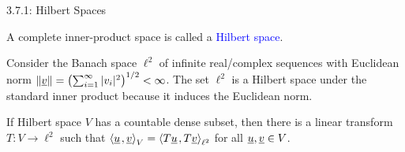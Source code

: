 \documentclass[10pt,letterpaper,english]{beamer}
\begin{document}
\begin{frame}{3.7.1: Hilbert Spaces}

\begin{definition}
A complete inner-product space is called a \textcolor{blue}{Hilbert space}.
\end{definition}

\begin{example}
Consider the Banach space $\ell^2$ of infinite real/complex sequences with Euclidean norm $\|\underline{v}\| = \left( \sum_{i=1}^\infty |v_i|^2 \right)^{1/2} < \infty$.
The set $\ell^2$ is a Hilbert space under the standard inner product because it induces the Euclidean norm.
\end{example}

\begin{theorem} 
If Hilbert space $V$ has a countable dense subset, then there is a linear transform $T:V\to \ell^2$ such that ${\left\langle  \underline{u}  \mskip2mu ,  \underline{v}  \right\rangle}_V = {\left\langle  T\underline{u}  \mskip2mu ,  T\underline{v}  \right\rangle}_{\ell^2}$ for all $\underline{u},\underline{v} \in V$.
\end{theorem}


\end{frame}

%
%
\end{document}
